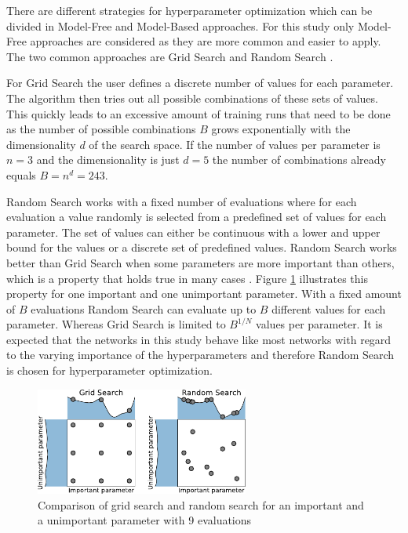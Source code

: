 \documentclass[conference]{IEEEtran}
\begin{document}
There are different strategies for hyperparameter optimization which can be divided in Model-Free and Model-Based approaches. For this study only Model-Free approaches are considered as they are more common and easier to apply. The two common approaches are Grid Search and Random Search \cite{Feurer2019}. 

For Grid Search the user defines a discrete number of values for each parameter. The algorithm then tries out all possible combinations of these sets of values. This quickly leads to an excessive amount of training runs that need to be done as the number of possible combinations $ B $ grows exponentially with the dimensionality $ d $ of the search space. If the number of values per parameter is $ n = 3 $ and the dimensionality is just $ d = 5 $ the number of combinations already equals $ B = n^d = 243 $.

Random Search works with a fixed number of evaluations where for each evaluation a value randomly is selected from a predefined set of values for each parameter. The set of values can either be continuous with a lower and upper bound for the values or a discrete set of predefined values. Random Search works better than Grid Search when some parameters are more important than others, which is a property that holds true in many cases \cite{Feurer2019}. Figure \ref{fig:grid_search_random_search} illustrates this property for one important and one unimportant parameter. With a fixed amount of $ B $ evaluations Random Search can evaluate up to $ B $ different values for each parameter. Whereas Grid Search is limited to $ B^{1/N} $ values per parameter. It is expected that the networks in this study behave like most networks with regard to the varying importance of the hyperparameters and therefore Random Search is chosen for hyperparameter optimization.

\begin{figure}[htp]
	\centering
	\includegraphics[width=7cm]{grid_search_random_search.pdf}
	\caption{Comparison of grid search and random search for an important and a unimportant parameter with 9 evaluations \cite{Feurer2019}}
	\label{fig:grid_search_random_search}
\end{figure}
\end{document}
